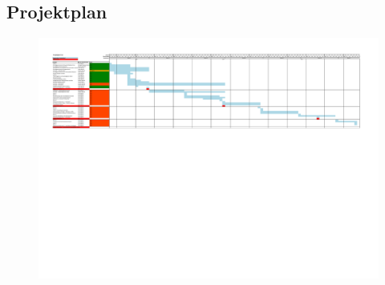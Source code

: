 \documentclass[main.tex]{subfiles} %
\begin{document}

\begin{landscape}

    \section{Projektplan}

    \begin{figure}[h!]
        \centering
        \includegraphics[width=1\linewidth]{../resources/Projektplan_04102024_cropped.pdf}
    \end{figure}

\end{landscape}

\restoregeometry
\end{document}

